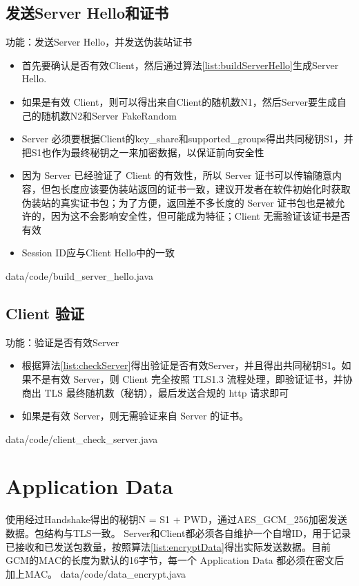 \subsection{发送Server Hello和证书}
功能：发送Server Hello，并发送伪装站证书
\begin{itemize}
	\item 首先要确认是否有效Client，然后通过算法\ref{list:buildServerHello}生成Server Hello.

	\item 如果是有效 Client，则可以得出来自Client的随机数N1，然后Server要生成自己的随机数N2和Server FakeRandom

	\item Server 必须要根据Client的key\_share和supported\_groups得出共同秘钥S1，并把S1也作为最终秘钥之一来加密数据，以保证前向安全性

	\item 因为 Server 已经验证了 Client 的有效性，所以 Server 证书可以传输随意内容，但包长度应该要伪装站返回的证书一致，建议开发者在软件初始化时获取伪装站的真实证书包；为了方便，返回差不多长度的 Server 证书包也是被允许的，因为这不会影响安全性，但可能成为特征；Client 无需验证该证书是否有效

	\item Session ID应与Client Hello中的一致
\end{itemize}
 {data/code/build_server_hello.java}

\subsection{Client 验证}
功能：验证是否有效Server
\begin{itemize}
	\item 根据算法\ref{list:checkServer}得出验证是否有效Server，并且得出共同秘钥S1。如果不是有效 Server，则 Client 完全按照 TLS1.3 流程处理，即验证证书，并协商出 TLS 最终随机数（秘钥），最后发送合规的 http 请求即可

	\item 如果是有效 Server，则无需验证来自 Server 的证书。
\end{itemize}
 {data/code/client_check_server.java}

\section{Application Data}
使用经过Handshake得出的秘钥N = S1 + PWD，通过AES\_GCM\_256加密发送数据。包结构与TLS一致。
Server和Client都必须各自维护一个自增ID，用于记录已接收和已发送包数量，按照算法\ref{list:encryptData}得出实际发送数据。目前GCM的MAC的长度为默认的16字节，每一个 Application Data 都必须在密文后加上MAC。
 {data/code/data_encrypt.java}
